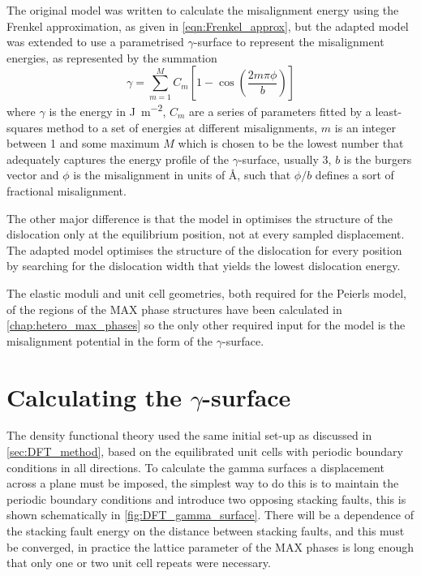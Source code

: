 The original model was written to calculate the misalignment energy using the Frenkel approximation, as given in \autoref{eqn:Frenkel_approx}, but the adapted model was extended to use a parametrised $\gamma$-surface to represent the misalignment energies, as represented by the summation
\begin{equation}
\gamma = \sum_{m=1}^{M} C_m \left[ 1 - \cos \left( \frac{2m\pi \phi}{b} \right) \right]\label{eqn:gamma_surface}
\end{equation}
where $\gamma$ is the energy in \si{\joule\per\meter\squared}, $C_m$ are a series of parameters fitted by a least-squares method to a set of energies at different misalignments, $m$ is an integer between 1 and some maximum $M$ which is chosen to be the lowest number that adequately captures the energy profile of the $\gamma$-surface, usually 3, $b$ is the burgers vector and $\phi$ is the misalignment in units of \si{\angstrom}, such that $\phi/b$ defines a sort of fractional misalignment.

The other major difference is that the model in \cite{Clegg2006} optimises the structure of the dislocation only at the equilibrium position, not at every sampled displacement. The adapted model optimises the structure of the dislocation for every position by searching for the dislocation width that yields the lowest dislocation energy.


The elastic moduli and unit cell geometries, both required for the Peierls model, of the regions of the MAX phase structures have been calculated in \autoref{chap:hetero_max_phases} so the only other required input for the model is the misalignment potential in the form of the $\gamma$-surface.

\section{Calculating the \texorpdfstring{$\gamma$}{gamma}-surface}


The density functional theory used the same initial set-up as discussed in \autoref{sec:DFT_method}, based on the equilibrated unit cells with periodic boundary conditions in all directions. To calculate the gamma surfaces a displacement across a plane must be imposed, the simplest way to do this is to maintain the periodic boundary conditions and introduce two opposing stacking faults, this is shown schematically in \autoref{fig:DFT_gamma_surface}. There will be a dependence of the stacking fault energy on the distance between stacking faults, and this must be converged, in practice the lattice parameter of the MAX phases is long enough that only one or two unit cell repeats were necessary.

